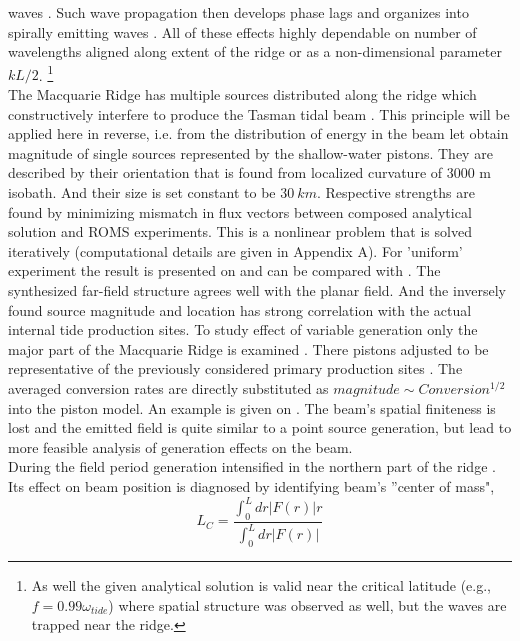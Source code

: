 \documentclass[12pt]{article}
\begin{document}
waves . Such wave propagation then develops phase lags and organizes into  
spirally emitting waves \citep{baines2007internal}. All of these effects highly dependable on 
number of wavelengths aligned along extent of the ridge or as a non-dimensional parameter $k L/2$. 
\footnote{As well the given analytical solution is valid near the critical latitude (e.g., $f = 
0.99 
\omega_{tide}$) where spatial structure was observed as well, but the waves are trapped near the 
ridge.}\\
The Macquarie Ridge has multiple sources distributed along the ridge which constructively 
interfere to produce the Tasman tidal beam \citep{rainville2010interference, 
klymak2016reflection}. This principle will be applied here in reverse, i.e. from the distribution 
of energy in the beam let obtain magnitude of single sources represented by the shallow-water 
pistons. They are described by their orientation that is found from localized curvature of $3000$ m 
isobath. And their size is set constant to be $30~km$. Respective strengths are found by minimizing 
mismatch in flux vectors between composed analytical solution and ROMS experiments. This is a 
nonlinear problem that is solved iteratively (computational details are given in Appendix A). 
For 'uniform' experiment the result is presented on  and can be compared 
with . The synthesized far-field structure agrees well with the planar field. 
And the inversely found source magnitude and location has strong correlation with the actual 
internal tide production sites. To study effect of variable generation only the major part of the 
Macquarie Ridge is examined . There pistons adjusted to be representative of 
the previously considered primary production sites . The averaged conversion 
rates are directly substituted as $magnitude \sim Conversion^{1/2}$ into the piston model. An 
example is given on . The beam's spatial finiteness is lost and the 
emitted field is quite similar to a point source generation, but lead to more feasible analysis of 
generation effects on the beam.\\
During the field period generation intensified in the northern part of the ridge 
. Its effect on beam position is diagnosed by identifying beam's 
''center of mass",
\begin{equation}
L_{C} = \frac{\int_0^{L} dr |F(r)|r}{\int_0^{L} dr |F(r)|}
\end{equation}
\end{document}
